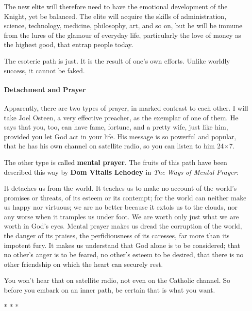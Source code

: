 The new elite will therefore need to have the emotional development of the Knight, yet be balanced. The elite will acquire the skills of administration, science, technology, medicine, philosophy, art, and so on, but he will be immune from the lures of the glamour of everyday life, particularly the love of money as the highest good, that entrap people today.

The esoteric path is just. It is the result of one's own efforts. Unlike worldly success, it cannot be faked.

\paragraph{Detachment and Prayer}


Apparently, there are two types of prayer, in marked contrast to each other. I will take Joel Osteen, a very effective preacher, as the exemplar of one of them. He says that you, too, can have fame, fortune, and a pretty wife, just like him, provided you let God act in your life. His message is so powerful and popular, that he has his own channel on satellite radio, so you can listen to him 24×7.

The other type is called \textbf{mental prayer}. The fruits of this path have been described this way by \textbf{Dom Vitalis Lehodey} in \emph{The Ways of Mental Prayer}:


\begin{quotex}
It detaches us from the world. It teaches us to make no account of the world's promises or threats, of its esteem or its contempt; for the world can neither make us happy nor virtuous; we are no better because it extols us to the clouds, nor any worse when it tramples us under foot. We are worth only just what we are worth in God's eyes. Mental prayer makes us dread the corruption of the world, the danger of its praises, the perfidiousness of its caresses, far more than its impotent fury. It makes us understand that God alone is to be considered; that no other's anger is to be feared, no other's esteem to be desired, that there is no other friendship on which the heart can securely rest.
\end{quotex}


You won't hear that on satellite radio, not even on the Catholic channel. So before you embark on an inner path, be certain that is what you want.



\begin{center}* * *\end{center}

